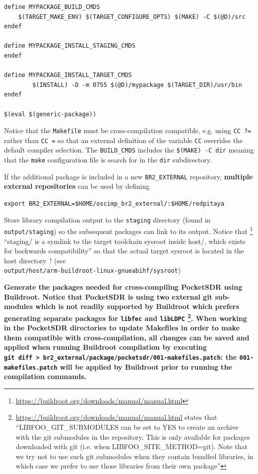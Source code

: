 \documentclass{article}
\begin{document}
{\begin{itemize}
\begin{verbatim}
define MYPACKAGE_BUILD_CMDS
    $(TARGET_MAKE_ENV) $(TARGET_CONFIGURE_OPTS) $(MAKE) -C $(@D)/src
endef

define MYPACKAGE_INSTALL_STAGING_CMDS
endef

define MYPACKAGE_INSTALL_TARGET_CMDS
        $(INSTALL) -D -m 0755 $(@D)/mypackage $(TARGET_DIR)/usr/bin
endef

$(eval $(generic-package))
\end{verbatim}
\end{itemize}

Notice that the {\tt Makefile} must be cross-compilation compatible, e.g. using {\tt CC ?=} rather than {\tt CC =} so
that an external definition of the variable {\tt CC} overrides the default compiler selection. The {\tt BUILD\_CMDS} includes
the {\tt \$(MAKE) -C dir} meaning that the {\tt make} configuration file is search for in the {\tt dir} subdirectory.

If the additional package is included in a new {\tt BR2\_EXTERNAL} repository, {\bf multiple external repositories}
can be used by defining

\verb~export BR2_EXTERNAL=$HOME/oscimp_br2_external/:$HOME/redpitaya~

Store library compilation output to the {\tt staging} directory (found in {\tt output/staging}) so the subsequent packages 
can link to its output. Notice that
\footnote{\url{https://buildroot.org/downloads/manual/manual.html}} ``staging/ is a symlink to the target toolchain sysroot inside host/, which exists for 
backwards compatibility'' so that the actual target sysroot is located in the host directory~! (see \\
{\tt output/host/arm-buildroot-linux-gnueabihf/sysroot})

{\bf Generate the packages needed for cross-compiling PocketSDR using Buildroot. Notice that PocketSDR is using two external git sub-modules
which is not readily supported by Buildroot which prefers generating separate packages for {\tt libfec} and {\tt libLDPC}
\footnote{\url{https://buildroot.org/downloads/manual/manual.html} states that ``LIBFOO\_GIT\_SUBMODULES can be set to YES to create 
an archive with the git submodules in the repository. This is only available for packages downloaded with git (i.e. when LIBFOO\_SITE\_METHOD=git). 
Note that we try not to use such git submodules when they contain bundled libraries, in which case we prefer to use those libraries from 
their own package''}. When working in the PocketSDR directories to update Makefiles in order to make them compatible with cross-compilation,
all changes can be saved and applied when running Buildroot compilation by executing \\ {\tt git diff > br2\_external/package/pocketsdr/001-makefiles.patch}: the {\tt 001-makefiles.patch} will be applied by Buildroot prior to running the compilation commands.}

}
\end{document}
